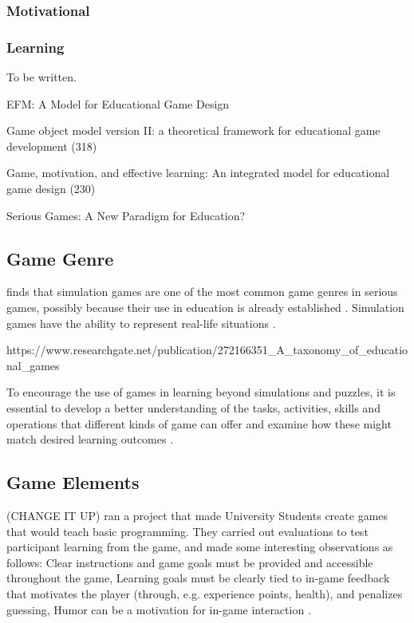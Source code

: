 \documentclass[a4paper,11.5pt]{report}
\numberwithin{figure}{section}
\numberwithin{table}{section}
\numberwithin{equation}{section}
\numberwithin{equation}{section}
\begin{document}
\subsubsection{Motivational}

\subsubsection{Learning}

To be written.

EFM: A Model for Educational Game Design

Game object model version II: a theoretical framework for educational game development (318)

Game, motivation, and effective learning: An integrated model for educational game design (230)

Serious Games: A New Paradigm for Education?

\subsection{Game Genre}

\citeauthor{Connolly2012} finds that simulation games are one of the most common game genres in serious games, possibly because their use in education is already established \citep{Connolly2012}. Simulation games have the ability to represent real-life situations \citep{Braghirolli2016}. 

https://www.researchgate.net/publication/272166351_A_taxonomy_of_educational_games

To encourage the use of games in learning beyond simulations and puzzles, it is essential to develop a better understanding of the tasks, activities, skills and operations that different kinds of game can offer and examine how these might match desired learning outcomes \citep{Connolly2012}.


\subsection{Game Elements}

(CHANGE IT UP) \citeauthor{Barnes2007} ran a project that made University Students create games that would teach basic programming. They carried out evaluations to test participant learning from the game, and made some interesting observations as follows: Clear instructions and game goals must be provided and accessible throughout the game, Learning goals must be clearly tied to in-game feedback that motivates the player (through, e.g. experience points, health), and penalizes guessing, Humor can be a motivation for in-game interaction \citep{Barnes2007}.
\end{document}
